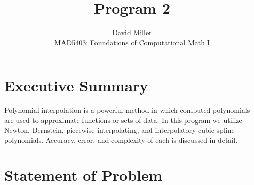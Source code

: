 \documentclass[12pt]{article}
\theoremstyle{remark}
\begin{document}
 
\title{Program 2}
\author{David Miller \\ 
MAD5403: Foundations of Computational Math I} 
 
\maketitle

\section{Executive Summary}

Polynomial interpolation is a powerful method in which computed polynomials are used to approximate functions or sets of data. In this program we utilize Newton, Bernstein, piecewise interpolating, and interpolatory cubic spline polynomials. Accuracy, error, and complexity of each is discussed in detail. 

\section{Statement of Problem} 
\end{document}
